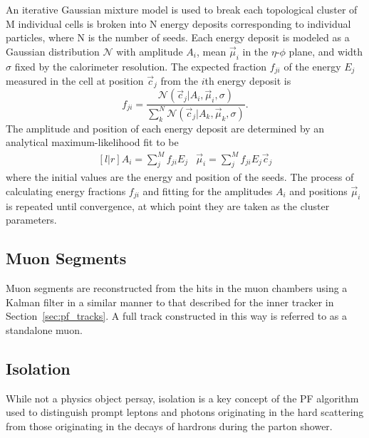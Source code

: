 An iterative Gaussian mixture model is used to break each topological cluster of M individual cells is broken into N energy deposits corresponding to individual particles, where N is the number of seeds.
Each energy deposit is modeled as a Gaussian distribution $\mathcal{N}$ with amplitude $A_i$, mean $\vec \mu_i$ in the $\eta$-$\phi$ plane, and width $\sigma$ fixed by the calorimeter resolution.
The expected fraction $f_{ji}$ of the energy $E_j$ measured in the cell at position $\vec c_j$ from the $i$th energy deposit is
\begin{equation}
  f_{ji} = \dfrac{\mathcal{N}\left(\vec c_j | A_i, \vec \mu_i, \sigma\right)}
  {\sum_k^N \mathcal{N}\left(\vec c_j | A_k, \vec \mu_k, \sigma\right)}.
\end{equation}
The amplitude and position of each energy deposit are determined by an analytical maximum-likelihood fit to be
\begin{equation}
  \begin{matrix}[l | r]
    A_i = \sum\limits_j^M f_{ji} E_j &
    \vec \mu_i = \sum\limits_j^M f_{ji} E_j \vec c_j
  \end{matrix}
\end{equation}
where the initial values are the energy and position of the seeds.
The process of calculating energy fractions $f_{ji}$ and fitting for the amplitudes $A_i$ and positions $\vec \mu_i$ is repeated until convergence, at which point they are taken as the cluster parameters.

\subsection{Muon Segments}
\label{sec:pf_segments}

Muon segments are reconstructed from the hits in the muon chambers using a Kalman filter in a similar manner to that described for the inner tracker in Section~\ref{sec:pf_tracks}.
A full track constructed in this way is referred to as a standalone muon.

\subsection{Isolation}
\label{sec:pf_isolation}

While not a physics object persay, isolation is a key concept of the PF algorithm used to distinguish prompt leptons and photons originating in the hard scattering from those originating in the decays of hardrons during the parton shower.

